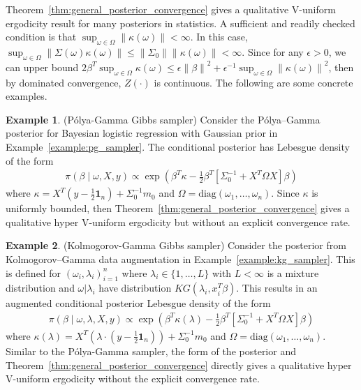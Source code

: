\documentclass[ejsv2, noshowframe]{imsart}
\theoremstyle{plain}
\theoremstyle{definition}
\newtheorem*{example}{Example}
\theoremstyle{remark}
\newcommand{\norm}[1]{\left\lVert#1\right\rVert}
\newcommand{\e}{\epsilon}
\newcommand{\w}{\omega}
\begin{document}
Theorem~\ref{thm:general_posterior_convergence} gives a qualitative V-uniform ergodicity result for many posteriors in statistics.
A sufficient and readily checked condition is that $\sup_{\w \in \Omega} \norm{\kappa(\w)} < \infty$.
In this case, $\sup_{\w \in \Omega} \norm{ \Sigma(\w) \kappa(\w) } \le \norm{ \Sigma_0 } \norm{ \kappa(\w) } < \infty$.
Since for any $\e > 0$, we can upper bound $2 \beta^T \sup_{\w \in \Omega} \kappa(\w) \le \e \norm{\beta}^2 + \e^{-1} \sup_{\w \in \Omega} \norm{ \kappa(\w) }^2$, then by dominated convergence, $Z(\cdot)$ is continuous.
The following are some concrete examples.

\begin{example}
(P\'olya-Gamma Gibbs sampler)
Consider the P\'olya--Gamma posterior for Bayesian logistic regression with Gaussian prior in Example~\ref{example:pg_sampler}. 
The conditional posterior has Lebesgue density of the form
\begin{align*}
\pi(\beta \mid \w, X, y )
\propto \exp\left( \beta^T \kappa -\frac{1}{2} \beta^T \left[ \Sigma_0^{-1}  + X^T \Omega X \right] \beta \right) 
\end{align*}
where $\kappa = X^T ( y - \tfrac{1}{2}\mathbf{1}_n ) + \Sigma_0^{-1} m_0$ and $\Omega = \text{diag}(\w_1, \ldots, \w_n)$.
Since $\kappa$ is uniformly bounded, then Theorem~\ref{thm:general_posterior_convergence} gives a qualitative hyper V-uniform ergodicity but without an explicit convergence rate.
\end{example}

\begin{example}
(Kolmogorov-Gamma Gibbs sampler)
Consider the posterior from Kolmogorov--Gamma data augmentation in Example~\ref{example:kg_sampler}.
This is defined for $(\w_i, \lambda_i)_{i = 1}^n$ where $\lambda_i \in \{1, \ldots, L \}$ with $L < \infty$ is a mixture distribution and $\w |\lambda_i$ have distribution $KG(\lambda_i, x_i^T \beta)$. 
This results in an augmented conditional posterior Lebesgue density of the form
\begin{align*}
\pi( \beta \mid \w, \lambda, X, y )
\propto \exp\left( \beta^T \kappa(\lambda) -\frac{1}{2} \beta^T \left[ \Sigma_0^{-1} + X^T \Omega X \right] \beta \right) 
\end{align*}
where $\kappa(\lambda) = X^T ( \lambda \cdot (y - \tfrac{1}{2}\mathbf{1}_n) ) + \Sigma_0^{-1} m_0$ and $\Omega = \text{diag}(\w_1, \ldots, \w_n)$.
Similar to the P\'olya-Gamma sampler, the form of the posterior and Theorem~\ref{thm:general_posterior_convergence} directly gives a qualitative hyper V-uniform ergodicity without the explicit convergence rate.
\end{example}
\end{document}
